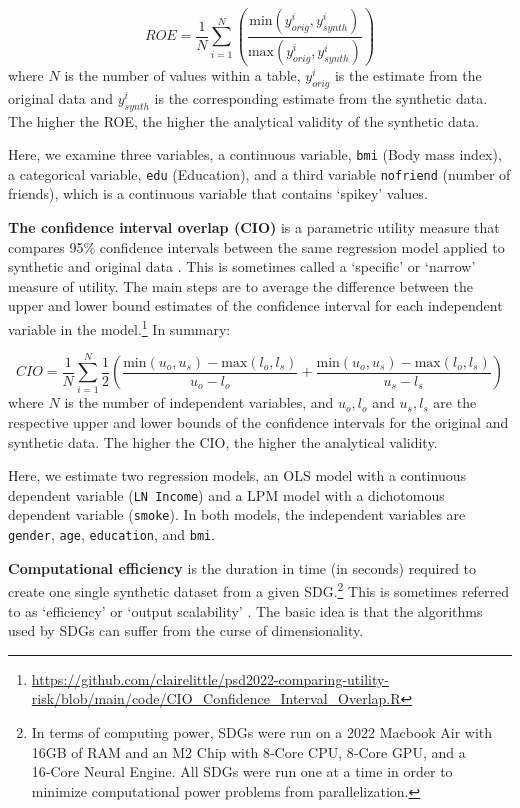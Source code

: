 \documentclass[runningheads]{llncs}
\begin{document}
\begin{equation}
    ROE = \frac{1}{N} \sum^{N}_{i=1} \left( \frac{\text{min}(y_{orig}^i,y_{synth}^i)}{\text{max}(y_{orig}^i,y_{synth}^i)} \right)
\end{equation}
where $N$ is the number of values within a table, $y^i_{orig}$ is the estimate from the original data and $y^i_{synth}$ is the corresponding estimate from the synthetic data.  The higher the ROE, the higher the analytical validity of the synthetic data.  

Here, we examine three variables, a continuous variable, \texttt{bmi} (Body mass index), a categorical variable, \texttt{edu} (Education), and a third variable \texttt{nofriend} (number of friends), which is a continuous variable that contains `spikey' values.  

{\bf The confidence interval overlap (CIO)} is a parametric utility measure that compares 95\% confidence intervals between the same regression model applied to synthetic and original data \cite{karr2006framework}.  This is sometimes called a `specific'\cite{snoke2018general} or `narrow'\cite{drechsler2009disclosure} measure of utility.  The main steps are to average the difference between the upper and lower bound estimates of the confidence interval for each independent variable in the model.\footnote{\url{https://github.com/clairelittle/psd2022-comparing-utility-risk/blob/main/code/CIO_Confidence_Interval_Overlap.R}} In summary:

\begin{equation}
    CIO = \frac{1}{N} \sum^{N}_{i=1} \frac{1}{2}\left(\frac{\text{min}(u_o,u_s) - \text{max}(l_o,l_s)}{u_o-l_o} + \frac{\text{min}(u_o,u_s) - \text{max}(l_o,l_s)}{u_s-l_s}\right)
\end{equation}
where $N$ is the number of independent variables, and $u_o,l_o$ and $u_s,l_s$ are the respective upper and lower bounds of the confidence intervals for the original and synthetic data.   The higher the CIO, the higher the analytical validity.  

Here, we estimate two regression models, an OLS model with a continuous dependent variable (\texttt{LN Income}) and a LPM model with a dichotomous dependent variable (\texttt{smoke}).  In both models, the independent variables are \texttt{gender}, \texttt{age}, \texttt{education}, and \texttt{bmi}.  


{\bf Computational efficiency} is the duration in time (in seconds) required to create one single synthetic dataset from a given SDG.\footnote{In terms of computing power, SDGs were run on a 2022 Macbook Air with 16GB of RAM and an M2 Chip with 8‑Core CPU, 8‑Core GPU, and a 16‑Core Neural Engine.  All SDGs were run one at a time in order to minimize computational power problems from parallelization.}  This is sometimes referred to as `efficiency'\cite{jordon2022synthetic} or `output scalability' \cite{zhang2017privbayes}.  The basic idea is that the algorithms used by SDGs can suffer from the curse of dimensionality.  
\end{document}
